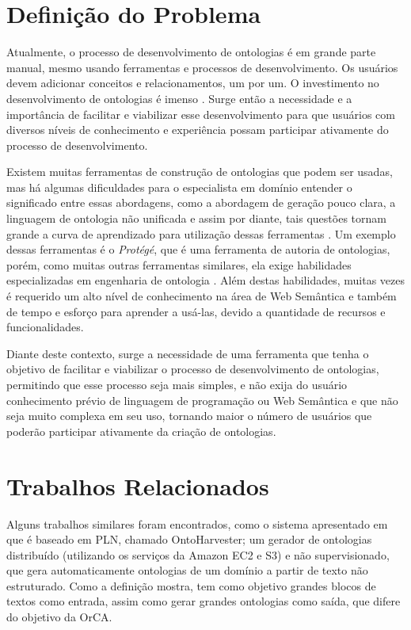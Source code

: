 \documentclass{bcc}
\begin{document}

\section{Definição do Problema}

Atualmente, o processo de desenvolvimento de ontologias é em grande parte manual, mesmo usando ferramentas e processos de desenvolvimento. Os usuários devem adicionar conceitos e relacionamentos, um por um. O investimento no desenvolvimento de ontologias é imenso \cite{liu2011}. Surge então a necessidade e a importância de facilitar e viabilizar esse desenvolvimento para que usuários com diversos níveis de conhecimento e experiência possam participar ativamente do processo de desenvolvimento.

Existem muitas ferramentas de construção de ontologias que podem ser usadas, mas há algumas dificuldades para o especialista em domínio entender o significado entre essas abordagens, como a abordagem de geração pouco clara, a linguagem de ontologia não unificada e assim por diante, tais questões tornam grande a curva de aprendizado para utilização dessas ferramentas \cite{zhou2010}. Um exemplo dessas ferramentas é o \textit{Protégé}, que é uma ferramenta de autoria de ontologias, porém, como muitas outras ferramentas similares, ela exige habilidades especializadas em engenharia de ontologia \cite{funk2007}. Além destas habilidades, muitas vezes é requerido um alto nível de conhecimento na área de Web Semântica e também de tempo e esforço para aprender a usá-las, devido a quantidade de recursos e funcionalidades.

Diante deste contexto, surge a necessidade de uma ferramenta que tenha o objetivo de facilitar e viabilizar o processo de desenvolvimento de ontologias, permitindo que esse processo seja mais simples, e não exija do usuário conhecimento prévio de linguagem de programação ou Web Semântica e que não seja muito complexa em seu uso, tornando maior o número de usuários que poderão participar ativamente da criação de ontologias.

\section{Trabalhos Relacionados}

Alguns trabalhos similares foram encontrados, como o sistema apresentado em \cite{mousavi2013} que é baseado em PLN, chamado OntoHarvester; um gerador de ontologias distribuído (utilizando os serviços da Amazon EC2 e S3) e não supervisionado, que gera automaticamente ontologias de um domínio a partir de texto não estruturado. Como a definição mostra, tem como objetivo grandes blocos de textos como entrada, assim como gerar grandes ontologias como saída, que difere do objetivo da OrCA. 
\end{document}
